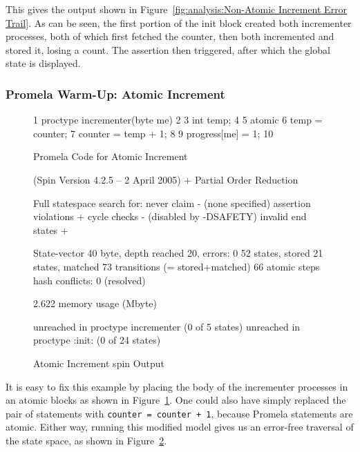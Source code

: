 This gives the output shown in
Figure~\ref{fig:analysis:Non-Atomic Increment Error Trail}.
As can be seen, the first portion of the init block created both
incrementer processes, both of which first fetched the counter,
then both incremented and stored it, losing a count.
The assertion then triggered, after which the global state is displayed.

\subsubsection{Promela Warm-Up: Atomic Increment}
\label{sec:formal:Promela Warm-Up: Atomic Increment}

\begin{figure}[htbp]
{ \scriptsize
\begin{verbbox}
  1 proctype incrementer(byte me)
  2 {
  3   int temp;
  4
  5   atomic {
  6     temp = counter;
  7     counter = temp + 1;
  8   }
  9   progress[me] = 1;
 10 }
\end{verbbox}
}
\centering
\theverbbox
\caption{Promela Code for Atomic Increment}
\label{fig:analysis:Promela Code for Atomic Increment}
\end{figure}

\begin{figure}[htbp]
{ \scriptsize
\begin{verbbox}
(Spin Version 4.2.5 -- 2 April 2005)
        + Partial Order Reduction

Full statespace search for:
        never claim             - (none specified)
        assertion violations    +
        cycle checks            - (disabled by -DSAFETY)
        invalid end states      +

State-vector 40 byte, depth reached 20, errors: 0
      52 states, stored
      21 states, matched
      73 transitions (= stored+matched)
      66 atomic steps
hash conflicts: 0 (resolved)

2.622   memory usage (Mbyte)

unreached in proctype incrementer
        (0 of 5 states)
unreached in proctype :init:
        (0 of 24 states)
\end{verbbox}
}
\centering
\theverbbox
\caption{Atomic Increment spin Output}
\label{fig:analysis:Atomic Increment spin Output}
\end{figure}

It is easy to fix this example by placing the body of the incrementer
processes in an atomic blocks as shown in
Figure~\ref{fig:analysis:Promela Code for Atomic Increment}.
One could also have simply replaced the pair of statements with
{\tt counter = counter + 1}, because Promela statements are
atomic.
Either way, running this modified model gives us an error-free traversal
of the state space, as shown in
Figure~\ref{fig:analysis:Atomic Increment spin Output}.

